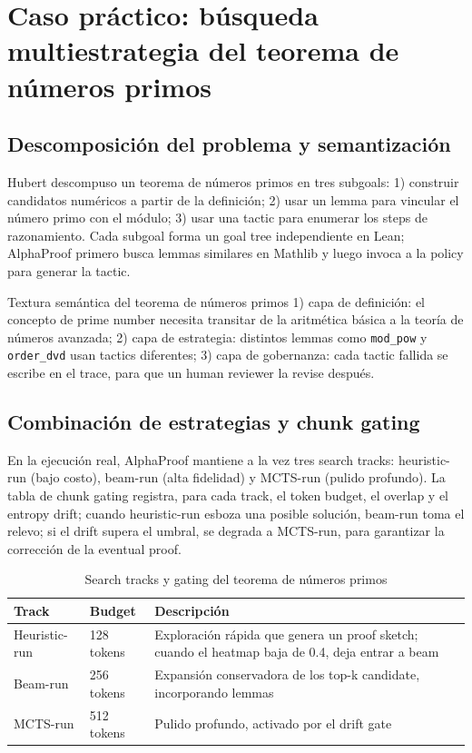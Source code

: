 \section{Caso práctico: búsqueda multiestrategia del teorema de números primos}

\subsection{Descomposición del problema y semantización}
Hubert descompuso un teorema de números primos en tres subgoals: 1) construir candidatos numéricos a partir de la definición; 2) usar un lemma para vincular el número primo con el módulo; 3) usar una tactic para enumerar los steps de razonamiento. Cada subgoal forma un goal tree independiente en Lean; AlphaProof primero busca lemmas similares en Mathlib y luego invoca a la policy para generar la tactic.

\begin{knowledgebox}{Textura semántica del teorema de números primos}
1) capa de definición: el concepto de prime number necesita transitar de la aritmética básica a la teoría de números avanzada; 2) capa de estrategia: distintos lemmas como \texttt{mod\_pow} y \texttt{order\_dvd} usan tactics diferentes; 3) capa de gobernanza: cada tactic fallida se escribe en el trace, para que un human reviewer la revise después.
\end{knowledgebox}

\subsection{Combinación de estrategias y chunk gating}
En la ejecución real, AlphaProof mantiene a la vez tres search tracks: heuristic-run (bajo costo), beam-run (alta fidelidad) y MCTS-run (pulido profundo). La tabla de chunk gating registra, para cada track, el token budget, el overlap y el entropy drift; cuando heuristic-run esboza una posible solución, beam-run toma el relevo; si el drift supera el umbral, se degrada a MCTS-run, para garantizar la corrección de la eventual proof.

\begin{table}[H]
\centering
\begin{tabular}{p{3.5cm}p{3.5cm}p{5cm}}
\toprule
Track & Budget & Descripción \\
\midrule
Heuristic-run & 128 tokens & Exploración rápida que genera un proof sketch; cuando el heatmap baja de 0.4, deja entrar a beam \\
Beam-run & 256 tokens & Expansión conservadora de los top-k candidate, incorporando lemmas \\
MCTS-run & 512 tokens & Pulido profundo, activado por el drift gate \\
\bottomrule
\end{tabular}
\caption{Search tracks y gating del teorema de números primos}
\end{table}

